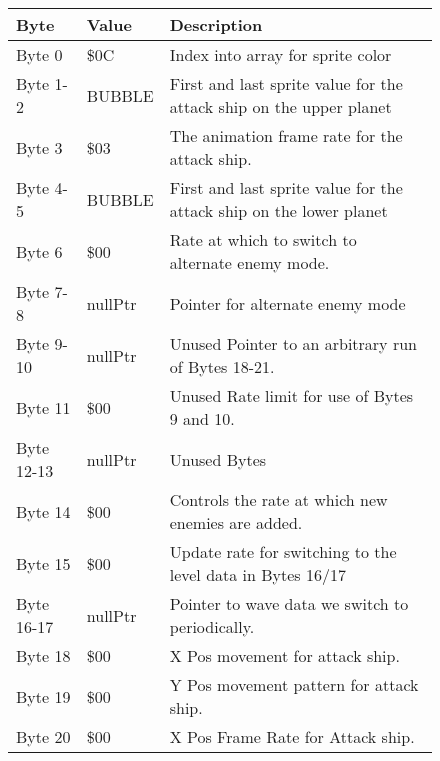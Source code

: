 \begin{figure}[H]
  {
  \setlength{\tabcolsep}{3.0pt}
  \setlength\cmidrulewidth{\heavyrulewidth} %
  \begin{adjustbox}{width=12cm}

\begin{tabular}{lll}
\toprule
 Byte       & Value            & Description                                                         \\
\midrule
 Byte 0     & \$0C              & Index into array for sprite color                                   \\
 Byte 1-2   & BUBBLE           & First and last sprite value for the attack ship on the upper planet \\
 Byte 3     & \$03              & The animation frame rate for the attack ship.                       \\
 Byte 4-5   & BUBBLE           & First and last sprite value for the attack ship on the lower planet \\
 Byte 6     & \$00              & Rate at which to switch to alternate enemy mode.                    \\
 Byte 7-8   & nullPtr          & Pointer for alternate enemy mode                                    \\
 Byte 9-10  & nullPtr          & Unused Pointer to an arbitrary run of Bytes 18-21.                  \\
 Byte 11    & \$00              & Unused Rate limit for use of Bytes 9 and 10.                        \\
 Byte 12-13 & nullPtr          & Unused Bytes                                                        \\
 Byte 14    & \$00              & Controls the rate at which new enemies are added.                   \\
 Byte 15    & \$00              & Update rate for switching to the level data in Bytes 16/17          \\
 Byte 16-17 & nullPtr          & Pointer to wave data we switch to periodically.                     \\
 Byte 18    & \$00              & X Pos movement for attack ship.                                     \\
 Byte 19    & \$00              & Y Pos movement pattern for attack ship.                             \\
 Byte 20    & \$00              & X Pos Frame Rate for Attack ship.                                   \\

\end{tabular}
\end{adjustbox}}
\end{figure}
